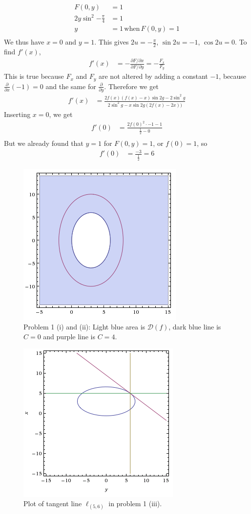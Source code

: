 \documentclass[a4paper,norsk,12pt]{article}
\begin{document}
\begin{align*}
  F(0,y) &= 1 \\
  2y\sin^2{-\frac{\pi}{4}} &= 1\\
  y &= 1 \,\text{when}\, F(0,y)=1\\
\end{align*}
We thus have $x=0$ and $y=1$. This gives $2u = -\frac{\pi}{2}$, $\sin{2u} =
-1$, $\cos{2u} = 0$. To find $f'(x)$,
\begin{align*}
  f'(x) &= -\frac{\partial F / \partial x}{\partial F / \partial y}
  = -\frac{F_x}{F_y}
\end{align*}
This is true because $F_x$ and $F_y$ are not altered by adding a constant $-1$,
because $\frac{\partial}{\partial x}\left(-1\right) = 0$ and the same for
$\frac{\partial}{\partial y}$. Therefore we get
\begin{align*}
  f'(x) &= \frac{
        2f(x)(f(x)-x)\sin{2g}-2\sin^2{g}
    } {
        2\sin^2{g}-x\sin{2g}(2f(x)-2x))
    }
\end{align*}
Inserting $x=0$, we get
\begin{align*}
  f'(0) &= \frac{2f(0)^2\cdot-1 - 1}{\frac{1}{2}-0} \\
\end{align*}
But we already found that $y=1$ for $F(0,y)=1$, or $f(0)=1$, so
\begin{align*}
  f'(0) &= \frac{-3}{\frac{1}{2}} = 6
\end{align*}

\begin{figure}[h]
  \centering
  \includegraphics{ob1plot2.png}
  \caption{Problem 1 (i) and (ii): Light blue area is $\mathcal{D}(f)$,
           dark blue line is $C=0$ and purple line is $C=4$.}
  \label{plot.p2}
  \label{plot.p1}
\end{figure}

\begin{figure}[h]
  \centering
  \includegraphics{ob1plot3.png}
  \caption{Plot of tangent line $\ell_{(5,6)}$ in problem 1 (iii).}
  \label{plot.p3}
\end{figure}
\end{document}
